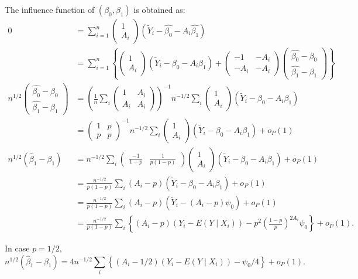 \documentclass[10pt,a4paper]{amsart}
\newcommand{\EE}{E}
\begin{document}
The influence function of $(\beta_0,\beta_1)$ is obtained as:
\begin{align*}
  0 &= \sum_{i=1}^n\begin{pmatrix}1\\A_i\end{pmatrix}(\tilde{Y}_i - \hat{\beta_0} - A_i\hat{\beta_1})\\
    &= \sum_{i=1}^n\left\{\begin{pmatrix}1\\A_i\end{pmatrix}(\tilde{Y}_i - \beta_0 - A_i\beta_1) +
  \begin{pmatrix}-1&-A_i\\-A_i&-A_i\end{pmatrix}\begin{pmatrix}\hat{\beta_0}-\beta_0\\ \hat{\beta_1}-\beta_1\end{pmatrix}\right\}\\
  n^{1/2}\begin{pmatrix}\hat{\beta_0}-\beta_0\\ \hat{\beta_1}-\beta_1\end{pmatrix} &=\left(\frac{1}{n}\sum_i\begin{pmatrix}1&A_i\\A_i&A_i\end{pmatrix}\right)^{-1}n^{-1/2}\sum_i \begin{pmatrix}1\\A_i\end{pmatrix}(\tilde{Y}_i - \beta_0 - A_i\beta_1)\\
    &=\begin{pmatrix}1&p\\p&p\end{pmatrix}^{-1}n^{-1/2}\sum_i \begin{pmatrix}1\\A_i\end{pmatrix}(\tilde{Y}_i - \beta_0 - A_i\beta_1)+o_P(1)\\
  n^{1/2}(\hat{\beta}_1 - \beta_1) &= n^{-1/2}\sum_i \begin{pmatrix}\frac{-1}{1-p}&\frac{1}{p(1-p)}\end{pmatrix}\begin{pmatrix}1\\A_i\end{pmatrix}(\tilde{Y}_i - \beta_0 - A_i\beta_1) + o_P(1)\\
    &= \frac{n^{-1/2}}{p(1-p)}\sum_i (A_i-p)(\tilde{Y}_i - \beta_0 - A_i\beta_1) + o_P(1)\\
    &= \frac{n^{-1/2}}{p(1-p)}\sum_i (A_i-p)(\tilde{Y}_i - (A_i-p)\psi_0) + o_P(1)\\
    &= \frac{n^{-1/2}}{p(1-p)}\sum_i \left\{(A_i-p)(Y_i-\EE(Y\mid X_i)) - p^2\left(\frac{1-p}{p}\right)^{2A_i}\psi_0\right\} + o_P(1).
\end{align*}

In case $p=1/2,$
\[
n^{1/2}(\hat{\beta}_1 - \beta_1) = 4n^{-1/2}\sum_i \left\{(A_i-1/2)(Y_i-\EE(Y\mid X_i)) - \psi_0/4\right\} + o_P(1).
\]
\end{document}
